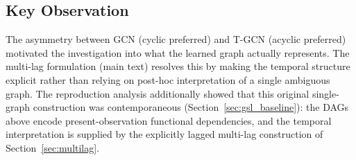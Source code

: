 \subsection{Key Observation}

The asymmetry between GCN (cyclic preferred) and T-GCN (acyclic preferred) motivated the investigation into what the learned graph actually represents. The multi-lag formulation (main text) resolves this by making the temporal structure explicit rather than relying on post-hoc interpretation of a single ambiguous graph. The reproduction analysis additionally showed that this original single-graph construction was contemporaneous (Section~\ref{sec:gsl_baseline}): the DAGs above encode present-observation functional dependencies, and the temporal interpretation is supplied by the explicitly lagged multi-lag construction of Section~\ref{sec:multilag}.
